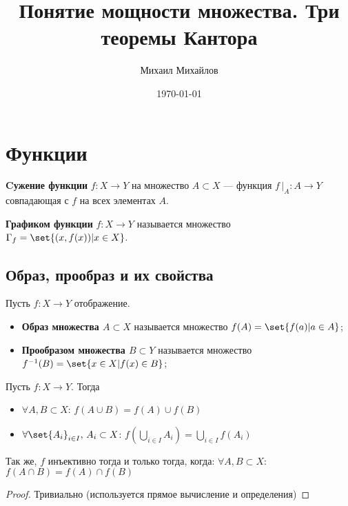 \documentclass{article}
\title{Понятие мощности множества. Три теоремы Кантора}
\author{Михаил Михайлов}
\date{\today}
\begin{document}
\maketitle
\tableofcontents

\newpage
\section{Функции}

\begin{definition}
    \label{def:function-restriction}
    \textbf{Cужение функции} \(f: X \rightarrow Y\) на множество \(A \subset X\) --- функция \(f\,|_A: A \rightarrow Y\) совпадающая с \(f\) на всех элементах \(A\).  
\end{definition}

\begin{definition}
    \label{def:function-graphics}
    \textbf{Графиком функции} \(f: X \rightarrow Y\) называется множество \(\Gamma_f = \set{(x, f(x)) | x \in X}\).
\end{definition}


\subsection{Образ, прообраз и их свойства}
\begin{definition}
    \label{def:function-image-preimage}
    Пусть \(f: X \rightarrow Y\) отображение.
    \begin{itemize}
        \item \textbf{Образ множества \(A \subset X\)} называется множество \(f(A) = \set{f(a) | a \in A}\);
        \item \textbf{Прообразом множества \(B \subset Y\)} называется множество \(f^{-1}(B) = \set{x \in X | f(x) \in B}\);
    \end{itemize}
\end{definition}


\begin{proposition}
    Пусть \(f: X \rightarrow Y\). Тогда 
    \begin{itemize}
        \item \(\forall A, B \subset X\): \(f(A \cup B) = f(A) \cup f(B)\)
        \item \(\forall \set{A_i}_{i \in I},\, A_i \subset X\):  \(f(\bigcup_{i \in I} A_i) = \bigcup_{i \in I} f(A_i)\)
    \end{itemize}
    Так же, \(f\) инъективно тогда и только тогда, когда:  \(\forall A, B \subset X\): \(f(A \cap B) = f(A) \cap f(B)\)
\end{proposition}
\begin{proof}
    Тривиально (используется прямое вычисление и определения)
\end{proof}
\end{document}
